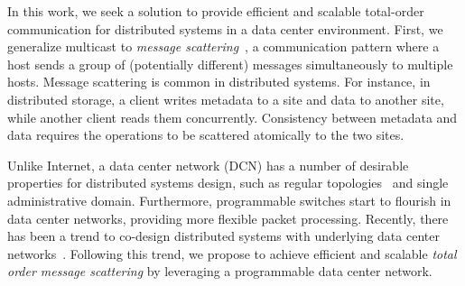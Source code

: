In this work, we seek a solution to provide efficient and scalable total-order communication for distributed systems in a data center environment. First, we generalize multicast to \textit{message scattering}~\cite{kshemkalyani2011distributed}, a communication pattern where a host sends a group of (potentially different) messages simultaneously to multiple hosts.
Message scattering is common in distributed systems.
For instance, in distributed storage, a client writes metadata to a site and data to another site, while another client reads them concurrently.
Consistency between metadata and data requires the operations to be scattered atomically to the two sites.



Unlike Internet, a data center network (DCN) has a number of desirable properties for distributed systems design, such as regular topologies~\cite{leiserson1985fat,greenberg2009vl2} and single administrative domain. Furthermore, programmable switches start to flourish in data center networks, providing more flexible packet processing. Recently, there has been a trend to co-design distributed systems with underlying data center networks~\cite{eris,netcache-sosp17,dang2016paxos}. Following this trend, we propose \sys to achieve efficient and scalable \textit{total order message scattering} by leveraging a programmable data center network.

